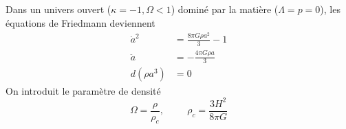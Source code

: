 \documentclass{article}
\numberwithin{equation}{section}
\begin{document}
\subsection{}
Dans un univers ouvert ($\kappa  = -1, \Omega < 1$) 
dominé par la matière ($\Lambda = p = 0$), les équations de Friedmann deviennent
\begin{align*}
        \dot{a}^{2} &=  \frac{8 \pi G \rho a^2}{3} - 1 \\
        \ddot{a} &=  -\frac{4\pi G \rho a}{3} \\
        d(\rho a^3) &=  0
\end{align*}
On introduit le paramètre de densité 
\[
        \Omega = \frac{\rho}{\rho_c}, \hspace{1cm} \rho_c = \frac{3H^2}{8 \pi G}
\]
\end{document}
